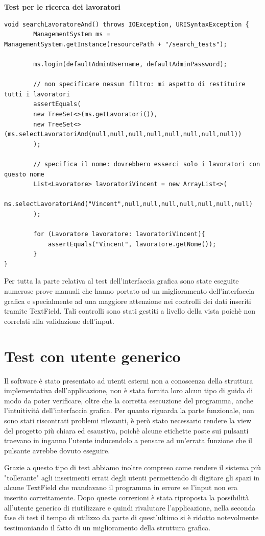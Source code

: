 \documentclass[ 4paper,11pt,openany]{book}
\begin{document}
\textbf{Test per le ricerca dei lavoratori}
\begin{lstlisting}[basicstyle=\small,xleftmargin=-0.5cm]
    void searchLavoratoreAnd() throws IOException, URISyntaxException {
        ManagementSystem ms = ManagementSystem.getInstance(resourcePath + "/search_tests");

        ms.login(defaultAdminUsername, defaultAdminPassword);

        // non specificare nessun filtro: mi aspetto di restituire tutti i lavoratori
        assertEquals(
        new TreeSet<>(ms.getLavoratori()),
        new TreeSet<>(ms.selectLavoratoriAnd(null,null,null,null,null,null,null,null))
        );

        // specifica il nome: dovrebbero esserci solo i lavoratori con questo nome
        List<Lavoratore> lavoratoriVincent = new ArrayList<>(
        ms.selectLavoratoriAnd("Vincent",null,null,null,null,null,null,null)
        );

        for (Lavoratore lavoratore: lavoratoriVincent){
            assertEquals("Vincent", lavoratore.getNome());
        }
}
\end{lstlisting}
Per tutta la parte relativa al test dell'interfaccia grafica sono state eseguite numerose prove manuali che hanno portato ad un miglioramento dell'interfaccia grafica e specialmente ad una maggiore attenzione nei controlli dei dati inseriti tramite TextField. Tali controlli sono stati gestiti a livello della vista poichè non correlati alla validazione dell'input.
\section{Test con utente generico}
Il software è stato presentato ad utenti esterni non a conoscenza della struttura implementativa dell'applicazione, non è stata fornita loro alcun tipo di guida di modo da poter verificare, oltre che la corretta esecuzione del programma, anche l'intuitività dell'interfaccia grafica. Per quanto riguarda la parte funzionale, non sono stati riscontrati problemi rilevanti, è però stato necessario rendere la view del progetto più chiara ed esaustiva, poichè alcune etichette poste sui pulsanti traevano in inganno l'utente inducendolo a pensare ad un'errata funzione che il pulsante avrebbe dovuto eseguire. 

Grazie a questo tipo di test abbiamo inoltre compreso come rendere il sistema più "tollerante" agli inserimenti errati degli utenti permettendo di digitare gli spazi in alcune TextField che mandavano il programma in errore se l'input non era inserito correttamente. Dopo queste correzioni è stata riproposta la possibilità all'utente generico di riutilizzare e quindi rivalutare l'applicazione, nella seconda fase di test il tempo di utilizzo da parte di quest'ultimo si è ridotto notevolmente testimoniando il fatto di un miglioramento della struttura grafica.
\end{document}
